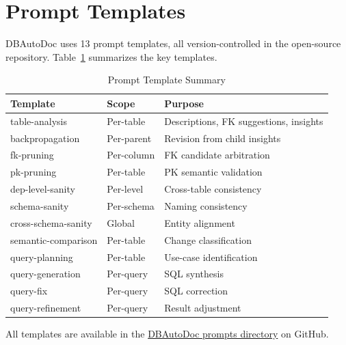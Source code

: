 \documentclass[sigconf, nonacm]{acmart}
\begin{document}
\section{Prompt Templates}\label{app:prompts}

DBAutoDoc uses 13 prompt templates, all version-controlled in the open-source repository. Table~\ref{tab:prompts} summarizes the key templates.

\begin{table}[htbp]
\caption{Prompt Template Summary}
\label{tab:prompts}
\begin{tabular}{llp{3.5cm}}
\toprule
\textbf{Template} & \textbf{Scope} & \textbf{Purpose} \\
\midrule
table-analysis & Per-table & Descriptions, FK suggestions, insights \\
backpropagation & Per-parent & Revision from child insights \\
fk-pruning & Per-column & FK candidate arbitration \\
pk-pruning & Per-table & PK semantic validation \\
dep-level-sanity & Per-level & Cross-table consistency \\
schema-sanity & Per-schema & Naming consistency \\
cross-schema-sanity & Global & Entity alignment \\
semantic-comparison & Per-table & Change classification \\
query-planning & Per-table & Use-case identification \\
query-generation & Per-query & SQL synthesis \\
query-fix & Per-query & SQL correction \\
query-refinement & Per-query & Result adjustment \\
\bottomrule
\end{tabular}
\end{table}

All templates are available in the \href{https://github.com/MemberJunction/MJ/tree/next/packages/DBAutoDoc/src/prompts}{DBAutoDoc prompts directory} on GitHub.




\end{document}
